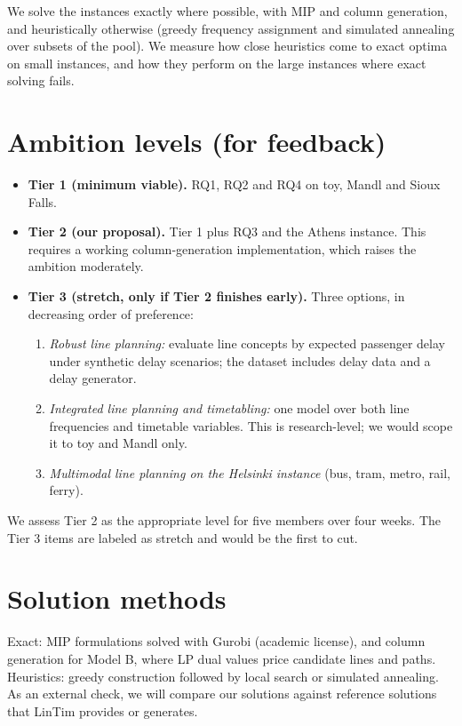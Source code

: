 \documentclass[11pt]{article}
\begin{document}
We solve the instances exactly where possible, with MIP and column generation, and heuristically otherwise (greedy frequency assignment and simulated annealing over subsets of the pool). We measure how close heuristics come to exact optima on small instances, and how they perform on the large instances where exact solving fails.

\section{Ambition levels (for feedback)}

\begin{itemize}
  \item \textbf{Tier 1 (minimum viable).} RQ1, RQ2 and RQ4 on toy, Mandl and Sioux Falls.
  \item \textbf{Tier 2 (our proposal).} Tier 1 plus RQ3 and the Athens instance. This requires a working column-generation implementation, which raises the ambition moderately.
  \item \textbf{Tier 3 (stretch, only if Tier 2 finishes early).} Three options, in decreasing order of preference:
    \begin{enumerate}
      \item \emph{Robust line planning:} evaluate line concepts by expected passenger delay under synthetic delay scenarios; the dataset includes delay data and a delay generator.
      \item \emph{Integrated line planning and timetabling:} one model over both line frequencies and timetable variables. This is research-level; we would scope it to toy and Mandl only.
      \item \emph{Multimodal line planning on the Helsinki instance} (bus, tram, metro, rail, ferry).
    \end{enumerate}
\end{itemize}

We assess Tier 2 as the appropriate level for five members over four weeks. The Tier 3 items are labeled as stretch and would be the first to cut.

\section{Solution methods}

Exact: MIP formulations solved with Gurobi (academic license), and column generation for Model B, where LP dual values price candidate lines and paths. Heuristics: greedy construction followed by local search or simulated annealing. As an external check, we will compare our solutions against reference solutions that LinTim provides or generates.
\end{document}
